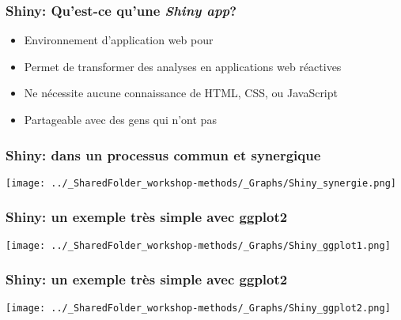 \documentclass{beamer}
\begin{document}

    \begin{frame}
    
      \frametitle{Shiny: Qu'est-ce qu'une \emph{Shiny app}?} \vspace{1cm}
      
    
    
        \begin{itemize}
          \item{Environnement d'application web pour \R}
          \item{Permet de transformer des analyses en applications web réactives}
          \item{Ne nécessite aucune connaissance de HTML, CSS, ou JavaScript}
          \item{Partageable avec des gens qui n’ont pas \R}
        \end{itemize}
          
    \end{frame}  
    

    \begin{frame}
    
      \frametitle{Shiny: dans un processus commun et synergique} \vspace{1cm}
      
        \begin{center}
      	  \texttt{[image: ../\_SharedFolder\_workshop-methods/\_Graphs/Shiny\_synergie.png]}
        \end{center} 
      
          
    \end{frame}  
    

    \begin{frame}
    
      \frametitle{Shiny: un exemple très simple avec ggplot2} \vspace{1cm}
      
        \begin{center}
      	  \texttt{[image: ../\_SharedFolder\_workshop-methods/\_Graphs/Shiny\_ggplot1.png]}
        \end{center} 
      
          
    \end{frame} 
    

    \begin{frame}
    
      \frametitle{Shiny: un exemple très simple avec ggplot2} \vspace{1cm}
      
        \begin{center}
      	  \texttt{[image: ../\_SharedFolder\_workshop-methods/\_Graphs/Shiny\_ggplot2.png]}
        \end{center} 
      
          
    \end{frame} 
    
\end{document}
